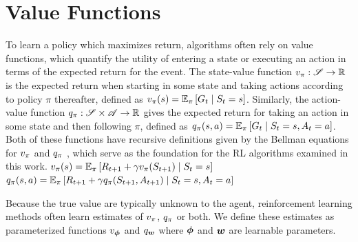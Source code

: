 \section{Value Functions}
To learn a policy which maximizes return, algorithms often rely on value functions, which quantify the utility of entering a state or executing an action in terms of the expected return for the event. The state-value function $v_{\pi}: \mathscr{S} \to \mathbb{R}$ is the expected return when starting in some state and taking actions according to policy $\pi$ thereafter, defined as $v_{\pi}(s) = \mathbb{E}_\pi \left[ G_t \mid S_t = s \right] $. Similarly, the action-value function $q_{\pi}: \mathscr{S} \times \mathscr{A} \to \mathbb{R}$ gives the expected return for taking an action in some state and then following $\pi$, defined as $ q_{\pi}(s, a) = \mathbb{E}_\pi \left[ G_t \mid S_t = s, A_t = a \right] $. 
Both of these functions have recursive definitions given by the Bellman equations for $v_{\pi}$ and $q_{\pi}$ , which serve as the foundation for the RL algorithms examined in this work. 
$v_{\pi}(s) = \mathbb{E}_\pi \left[ R_{t+1} + \gamma v_{\pi}(S_{t+1}) \mid S_t = s \right] $
$q_{\pi}(s, a) = \mathbb{E}_\pi \left[ R_{t+1} + \gamma q_{\pi}(S_{t+1}, A_{t+1}) \mid S_t = s, A_t = a \right] $

Because the true value are typically unknown to the agent, reinforcement learning methods often learn estimates of $v_{\pi}$, $q_{\pi}$ or both. We define these estimates as parameterized functions $v_{\bm \phi}$ and $q_{\bm w}$ where ${\bm \phi}$ and ${\bm w}$ are learnable parameters. 

